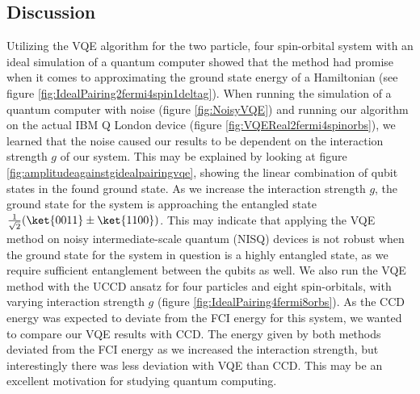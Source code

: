 \subsection{Discussion}
\label{sec:DiscussionVQE}
Utilizing the VQE algorithm for the two particle, four spin-orbital system with an ideal simulation of a quantum computer showed that the method had promise when it comes to approximating the ground state energy of a Hamiltonian (see figure \ref{fig:IdealPairing2fermi4spin1deltag}). When running the simulation of a quantum computer with noise (figure \ref{fig:NoisyVQE}) and running our algorithm on the actual IBM Q London device (figure \ref{fig:VQEReal2fermi4spinorbs}), we learned that the noise caused our results to be dependent on the interaction strength $g$ of our system. This may be explained by looking at figure \ref{fig:amplitudeagainstgidealpairingvqe}, showing the linear combination of qubit states in the found ground state. As we increase the interaction strength $g$, the ground state for the system is approaching the entangled state $\frac{1}{\sqrt{2}}(\ket{0011} \pm \ket{1100})$. This may indicate that applying the VQE method on noisy intermediate-scale quantum (NISQ) devices is not robust when the ground state for the system in question is a highly entangled state, as we require sufficient entanglement between the qubits as well.\newline
We also run the VQE method with the UCCD ansatz for four particles and eight spin-orbitals, with varying interaction strength $g$ (figure \ref{fig:IdealPairing4fermi8orbs}). As the CCD energy was expected to deviate from the FCI energy for this system, we wanted to compare our VQE results with CCD. The energy given by both methods deviated from the FCI energy as we increased the interaction strength, but interestingly there was less deviation with VQE than CCD. This may be an excellent motivation for studying quantum computing. 

